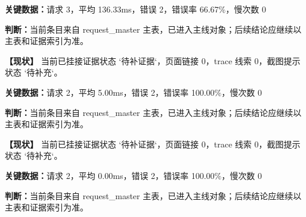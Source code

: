 

\vspace{0.35em}\par

\noindent\textbf{关键数据：}请求 3，平均 136.33ms，错误 2，错误率 66.67\%，慢次数 0\par

\noindent\textbf{判断：}当前条目来自 request\_master 主表，已进入主线对象；后续结论应继续以主表和证据索引为准。\par

\noindent\textbf{【现状】} 当前已挂接证据状态 `待补证据`，页面链接 0，trace 线索 0，截图提示状态 `待补充`。\par

\vspace{0.35em}\par

\noindent\textbf{关键数据：}请求 2，平均 5.00ms，错误 2，错误率 100.00\%，慢次数 0\par

\noindent\textbf{判断：}当前条目来自 request\_master 主表，已进入主线对象；后续结论应继续以主表和证据索引为准。\par

\noindent\textbf{【现状】} 当前已挂接证据状态 `待补证据`，页面链接 0，trace 线索 0，截图提示状态 `待补充`。\par

\vspace{0.35em}\par

\noindent\textbf{关键数据：}请求 2，平均 0.00ms，错误 2，错误率 100.00\%，慢次数 0\par

\noindent\textbf{判断：}当前条目来自 request\_master 主表，已进入主线对象；后续结论应继续以主表和证据索引为准。\par

